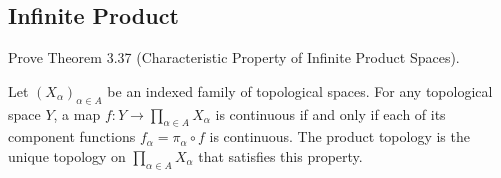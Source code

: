 \subsection*{Infinite Product}

\begin{exercise}{3.38}
	Prove Theorem 3.37 (Characteristic Property of Infinite Product Spaces).

	Let ${(X_{\alpha})}_{\alpha\in A}$ be an indexed family of topological spaces. For any topological space $Y$, a map $f: Y\to \prod_{\alpha\in A}X_{\alpha}$ is continuous if and only if each of its component functions $f_{\alpha} = \pi_{\alpha}\circ f$ is continuous. The product topology is the unique topology on $\prod_{\alpha\in A}X_{\alpha}$ that satisfies this property.
\end{exercise}

